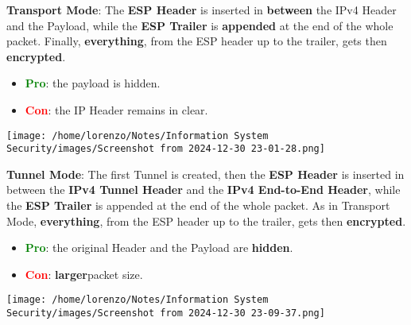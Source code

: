 \begin{itemize}
    \begin{minipage}{0.6\textwidth}
    \vspace{0.2cm}
    \item \textbf{Transport Mode}: The \textbf{ESP Header} is inserted in \textbf{between} the IPv4 Header and the Payload, while the \textbf{ESP Trailer} is \textbf{appended} at the end of the whole packet. Finally, \textbf{everything}, from the ESP header up to the trailer, gets then \textbf{encrypted}. 
    \begin{itemize}
        \item \textcolor{green}{\textbf{Pro}}: the payload is hidden.
        \item \textcolor{red}{\textbf{Con}}: the IP Header remains in clear. 
    \end{itemize}
    \end{minipage} 
    \hspace{0.0cm}
    \begin{minipage}{0.4\textwidth}
        \centering
        \texttt{[image: /home/lorenzo/Notes/Information System Security/images/Screenshot from 2024-12-30 23-01-28.png]}
    \end{minipage}

    \begin{minipage}{0.6\textwidth}
    \item \textbf{Tunnel Mode}: The first Tunnel is created, then the \textbf{ESP Header} is inserted in between the \textbf{IPv4 Tunnel Header} and the \textbf{IPv4 End-to-End Header}, while the \textbf{ESP Trailer} is appended at the end of the whole packet. As in Transport Mode, \textbf{everything}, from the ESP header up to the
    trailer, gets then \textbf{encrypted}.
    \begin{itemize}
        \item \textcolor{green}{\textbf{Pro}}: the original  Header and the Payload are \textbf{hidden}.
        \item \textcolor{red}{\textbf{Con}}: \textbf{larger}packet size.
    \end{itemize}
    \end{minipage} 
    \hspace{0.0cm}
    \begin{minipage}{0.4\textwidth}
        \centering
        \texttt{[image: /home/lorenzo/Notes/Information System Security/images/Screenshot from 2024-12-30 23-09-37.png]}
    \end{minipage}
\end{itemize}

